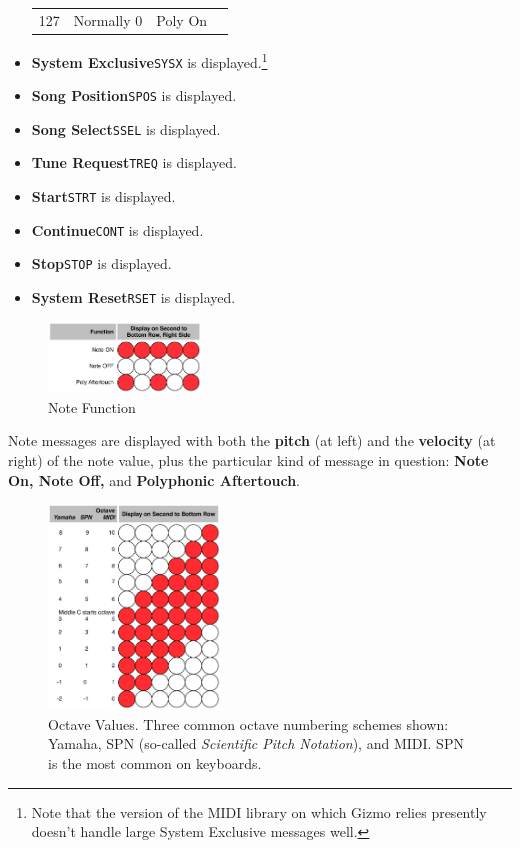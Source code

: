 \documentclass{article}
\begin{document}
\begin{itemize}
\begin{center}
\begin{tabular}{@{}rlll@{}}
127&Normally 0&Poly On\\
\end{tabular}\end{center}
\item {\bf System Exclusive}\quad \texttt{SYSX} is displayed.\footnote{Note that the version of the MIDI library on which Gizmo relies presently doesn't handle large System Exclusive messages well.}
\item {\bf Song Position}\quad \texttt{SPOS} is displayed.
\item {\bf Song Select}\quad \texttt{SSEL} is displayed.
\item {\bf Tune Request}\quad \texttt{TREQ} is displayed.
\item {\bf Start}\quad \texttt{STRT} is displayed.
\item {\bf Continue}\quad \texttt{CONT} is displayed.
\item {\bf Stop}\quad \texttt{STOP} is displayed.
\item {\bf System Reset}\quad \texttt{RSET} is displayed.
\end{itemize}


\begin{figure}
\vspace{-39em}\includegraphics[width=1.6in]{notefunction.pdf}
\vspace{-2em}\caption{\small Note Function}
\label{notefunction}
\end{figure}


Note messages are displayed with both the {\bf pitch} (at left) and the {\bf velocity} (at right) of the note value, plus the particular kind of message in question: {\bf Note On, Note Off,} and {\bf Polyphonic Aftertouch}.

\begin{figure}
\vspace{-32em}
\includegraphics[width=1.8in]{octave.pdf}
\vspace{-2em}\caption{\small Octave Values.  Three common octave numbering schemes shown: Yamaha, SPN (so-called {\it Scientific Pitch Notation}), and MIDI.  SPN is the most common on keyboards.}\vspace{-5em}
\label{octave}
\end{figure}
\end{document}
